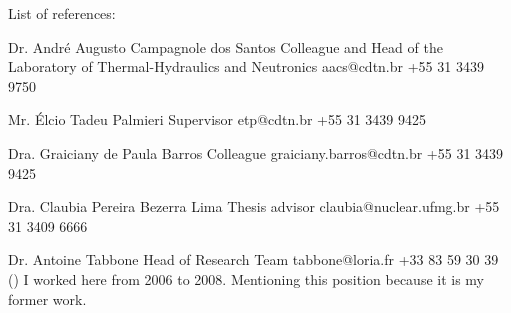 \documentclass{letter}
\begin{document}
List of references:

Dr. André Augusto Campagnole dos Santos\newline
Colleague and Head of the Laboratory of Thermal-Hydraulics and Neutronics\newline
aacs@cdtn.br\newline
+55 31 3439 9750\newline

Mr. Élcio Tadeu Palmieri\newline
Supervisor\newline
etp@cdtn.br\newline
+55 31 3439 9425\newline

Dra. Graiciany de Paula Barros\newline
Colleague\newline
graiciany.barros@cdtn.br\newline
+55 31 3439 9425\newline

Dra. Claubia Pereira Bezerra Lima\newline
Thesis advisor\newline
claubia@nuclear.ufmg.br\newline
+55 31 3409 6666\newline

Dr. Antoine Tabbone \dag\newline
Head of Research Team\newline
tabbone@loria.fr\newline
+33 83 59 30 39\newline
(\dag) I worked here from 2006 to 2008. \newline
Mentioning this position because it is my former work.\newline
\end{document}
